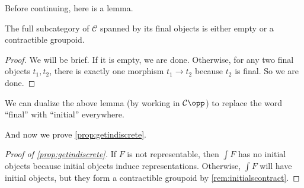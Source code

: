 \documentclass[../notes.tex]{subfiles}
\begin{document}
Before continuing, here is a lemma.
\begin{lemma}
	The full subcategory of $\mathcal C$ spanned by its final objects is either empty or a contractible groupoid.
\end{lemma}
\begin{proof}
	We will be brief. If it is empty, we are done. Otherwise, for any two final objects $t_1,t_2$, there is exactly one morphism $t_1\to t_2$ because $t_2$ is final. So we are done.
\end{proof}
\begin{remark} \label{rem:initialscontract}
	We can dualize the above lemma (by working in $\mathcal C\opp$) to replace the word ``final'' with ``initial'' everywhere.
\end{remark}
And now we prove \autoref{prop:getindiscrete}.
\begin{proof}[Proof of \autoref{prop:getindiscrete}]
	If $F$ is not representable, then $\int F$ has no initial objects because initial objects induce representations. Otherwise, $\int F$ will have initial objects, but they form a contractible groupoid by \autoref{rem:initialscontract}.
\end{proof}
\end{document}
